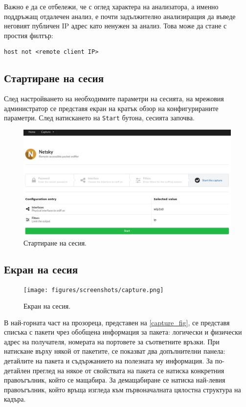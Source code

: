 \documentclass[12pt,a4paper,oneside]{book}
\begin{document}
Важно е да се отбележи, че с
оглед характера на анализатора, а именно поддръжащ отдалечен анализ, е почти
задължително анализиращия да въведе неговият публичен IP адрес като ненужен за
анализ. Това може да стане с простия филтър:

\begin{lstlisting}[caption=Филтър изолиращ адреса на
  отдалечения клиент от прихващаните пакети]
  host not <remote client IP>
\end{lstlisting}

\subsection{Стартиране на сесия}

След настройването на необходимите параметри на сесията, на мрежовия
администратор се представя екран на кратък обзор на конфигурираните параметри.
След натискането на \texttt{Start} бутона, сесията започва.

\begin{figure}[h!]
  \centering
  \includegraphics[width=\textwidth]{figures/screenshots/start.png}
  \caption{Стартиране на сесия.}
  \label{screenshots_start_fig}
\end{figure}

\subsection{Екран на сесия}

\begin{figure}[h!]
  \centering
  \texttt{[image: figures/screenshots/capture.png]}
  \caption{Екран на сесия.}
  \label{capture_fig}
\end{figure}

В най-горната част на прозореца, представен на \autoref{capture_fig}, се представя списъка с пакети чрез обобщена
информация за пакета: логически и физически адрес на получателя, номерата на
портовете за съответните връзки. При натискане върху някой от пакетите, се
показват два допълнителни панела: детайлите на пакета и съдържанието на
полезната му информация.
За по-детайлен преглед на някое от свойствата на пакета се натиска конкретния
правоъгълник, който се мащабира. За демащабиране се натиска най-левия
правоъгълник, който връща изгледа към първоначалната цялостна структура на
кадъра.
\end{document}
